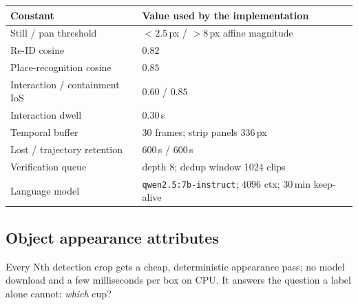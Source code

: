 \documentclass[10pt,a4paper]{article}
\newcommand{\code}[1]{\texttt{\small #1}}
\begin{document}
\begin{center}
\small
\begin{tabularx}{\linewidth}{@{}lX@{}}
\toprule
\textbf{Constant} & \textbf{Value used by the implementation} \\
\midrule
Still / pan threshold & $<2.5$\,px / $>8$\,px affine magnitude \\
Re-ID cosine & $0.82$ \\
Place-recognition cosine & $0.85$ \\
Interaction / containment IoS & $0.60$ / $0.85$ \\
Interaction dwell & $0.30$\,s \\
Temporal buffer & 30 frames; strip panels $336$\,px \\
Lost / trajectory retention & $600$\,s / $600$\,s \\
Verification queue & depth 8; dedup window 1024 clips \\
Language model & \code{qwen2.5:7b-instruct}; 4096 ctx; 30\,min keep-alive \\
\bottomrule
\end{tabularx}
\end{center}

\subsection{Object appearance attributes}

Every Nth detection crop gets a cheap, deterministic appearance pass; no model
download and a few milliseconds per box on CPU.  It answers the question a label
alone cannot: \emph{which} cup?
\end{document}
